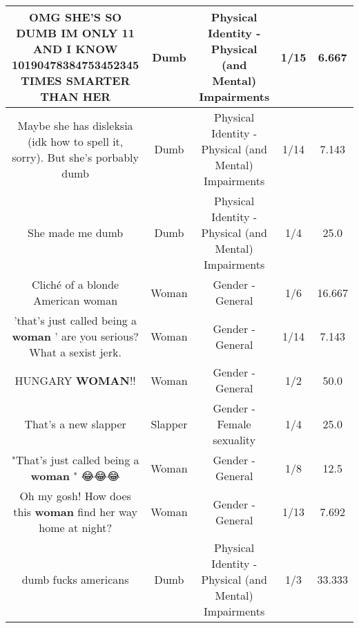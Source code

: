 \documentclass[11pt]{article}
\newlength\mylength
\begin{document}
\begin{center}
\begin{longtable}{|C{.65\mylength}|C{.30\mylength}|C{.12\mylength}|C{.12\mylength}|C{.12\mylength}|}
  \small OMG SHE'S SO \textbf{DUMB} IM ONLY 11 AND I KNOW 10190478384753452345 TIMES SMARTER THAN HER\normalsize   & Dumb & Physical Identity - Physical (and Mental) Impairments & 1/15 & 6.667 \\  \hline
  \small Maybe she has disleksia (idk how to spell it, sorry). But she's porbably dumb\normalsize   & Dumb & Physical Identity - Physical (and Mental) Impairments & 1/14 & 7.143 \\  \hline
  \small She made me dumb\normalsize   & Dumb & Physical Identity - Physical (and Mental) Impairments & 1/4 & 25.0 \\  \hline
  \small Cliché of a blonde American woman\normalsize   & Woman & Gender - General & 1/6 & 16.667 \\  \hline
  \small 'that's just called being a \textbf{woman} ' are you serious? What a sexist jerk.\normalsize   & Woman & Gender - General & 1/14 & 7.143 \\  \hline
  \small HUNGARY \textbf{WOMAN}!!\normalsize   & Woman & Gender - General & 1/2 & 50.0 \\  \hline
  \small That's a new slapper\normalsize   & Slapper & Gender - Female sexuality & 1/4 & 25.0 \\  \hline
  \small "That's just called being a \textbf{woman} " 😂😂😂\normalsize   & Woman & Gender - General & 1/8 & 12.5 \\  \hline
  \small Oh my gosh! How does this \textbf{woman} find her way home at night?\normalsize   & Woman & Gender - General & 1/13 & 7.692 \\  \hline
  \small dumb fucks americans\normalsize   & Dumb & Physical Identity - Physical (and Mental) Impairments & 1/3 & 33.333 \\  \hline

\end{longtable}
\end{center}
\end{document}
